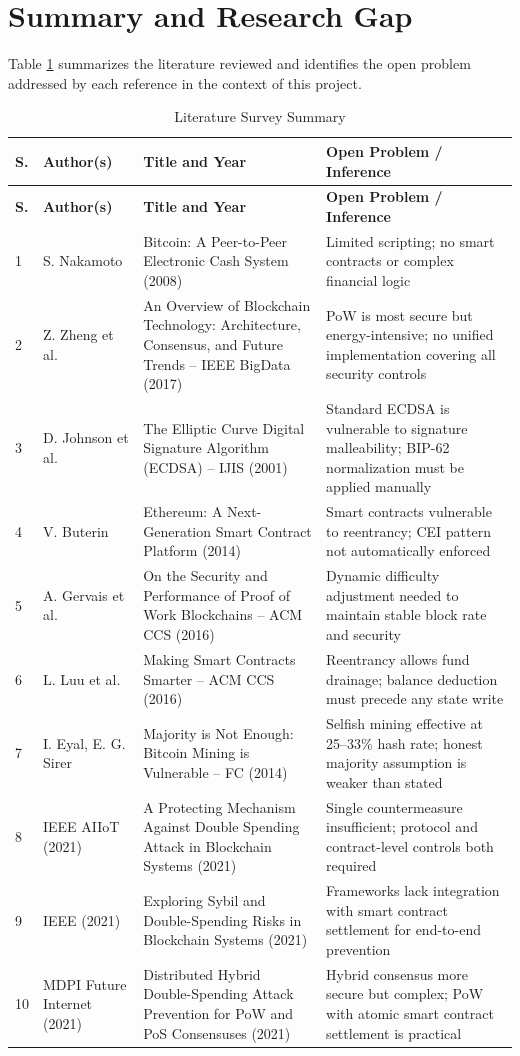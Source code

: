 \documentclass[12pt,a4paper]{report}
\begin{document}
\section{Summary and Research Gap}

Table \ref{tab:litsurvey} summarizes the literature reviewed and identifies the open
problem addressed by each reference in the context of this project.

\begin{longtable}{|p{0.4cm}|p{3.0cm}|p{5.0cm}|p{3.5cm}|}
\caption{Literature Survey Summary}
\label{tab:litsurvey}\\
\hline
\textbf{S.} & \textbf{Author(s)} & \textbf{Title and Year} & \textbf{Open Problem / Inference} \\
\hline
\endfirsthead
\hline
\textbf{S.} & \textbf{Author(s)} & \textbf{Title and Year} & \textbf{Open Problem / Inference} \\
\hline
\endhead
1 & S. Nakamoto & Bitcoin: A Peer-to-Peer Electronic Cash System (2008) & Limited scripting; no smart contracts or complex financial logic \\
\hline
2 & Z. Zheng et al. & An Overview of Blockchain Technology: Architecture, Consensus, and Future Trends -- IEEE BigData (2017) & PoW is most secure but energy-intensive; no unified implementation covering all security controls \\
\hline
3 & D. Johnson et al. & The Elliptic Curve Digital Signature Algorithm (ECDSA) -- IJIS (2001) & Standard ECDSA is vulnerable to signature malleability; BIP-62 normalization must be applied manually \\
\hline
4 & V. Buterin & Ethereum: A Next-Generation Smart Contract Platform (2014) & Smart contracts vulnerable to reentrancy; CEI pattern not automatically enforced \\
\hline
5 & A. Gervais et al. & On the Security and Performance of Proof of Work Blockchains -- ACM CCS (2016) & Dynamic difficulty adjustment needed to maintain stable block rate and security \\
\hline
6 & L. Luu et al. & Making Smart Contracts Smarter -- ACM CCS (2016) & Reentrancy allows fund drainage; balance deduction must precede any state write \\
\hline
7 & I. Eyal, E. G. Sirer & Majority is Not Enough: Bitcoin Mining is Vulnerable -- FC (2014) & Selfish mining effective at 25--33\% hash rate; honest majority assumption is weaker than stated \\
\hline
8 & IEEE AIIoT (2021) & A Protecting Mechanism Against Double Spending Attack in Blockchain Systems (2021) & Single countermeasure insufficient; protocol and contract-level controls both required \\
\hline
9 & IEEE (2021) & Exploring Sybil and Double-Spending Risks in Blockchain Systems (2021) & Frameworks lack integration with smart contract settlement for end-to-end prevention \\
\hline
10 & MDPI Future Internet (2021) & Distributed Hybrid Double-Spending Attack Prevention for PoW and PoS Consensuses (2021) & Hybrid consensus more secure but complex; PoW with atomic smart contract settlement is practical \\
\hline
\end{longtable}
\end{document}

